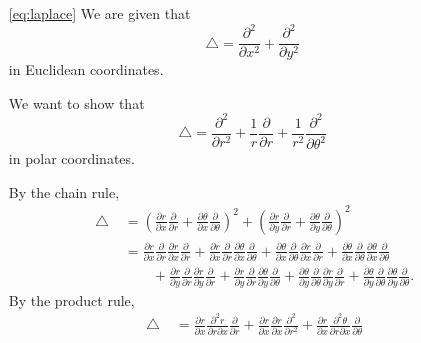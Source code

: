 \documentclass[oneside]{article}
\newcommand*\Laplace{\mathop{}\!\mathbin\bigtriangleup}
\begin{document}
\begin{itemize}
\item[\eqref{eq:laplace}]
We are given that \[
  \Laplace = \frac{\partial^2}{\partial x^2} + \frac{\partial^2}{\partial y^2}
\] in Euclidean coordinates.

We want to show that \[
  \Laplace = \frac{\partial^2}{\partial r^2}
             + \frac{1}{r}\frac{\partial}{\partial r}
             + \frac{1}{r^2}\frac{\partial^2}{\partial\theta^2}
\] in polar coordinates.

By the chain rule,\begin{align*}
  \Laplace
  &= \left(\frac{\partial r}{\partial x}\frac{\partial}{\partial r}
        +\frac{\partial\theta}{\partial x}\frac{\partial}{\partial\theta}
        \right)^2
    + \left(\frac{\partial r}{\partial y}\frac{\partial}{\partial r}
      + \frac{\partial\theta}{\partial y}\frac{\partial}{\partial\theta}
      \right)^2 \\
  &= \frac{\partial r}{\partial x}\frac{\partial}{\partial r}
      \frac{\partial r}{\partial x}\frac{\partial}{\partial r}
      + \frac{\partial r}{\partial x}\frac{\partial}{\partial r}
        \frac{\partial\theta}{\partial x}\frac{\partial}{\partial\theta}
      + \frac{\partial\theta}{\partial x}\frac{\partial}{\partial\theta}
        \frac{\partial r}{\partial x}\frac{\partial}{\partial r}
      + \frac{\partial\theta}{\partial x}\frac{\partial}{\partial\theta}
        \frac{\partial\theta}{\partial x}\frac{\partial}{\partial\theta} \\
  &\qquad+ \frac{\partial r}{\partial y}\frac{\partial}{\partial r}
           \frac{\partial r}{\partial y}\frac{\partial}{\partial r}
      + \frac{\partial r}{\partial y}\frac{\partial}{\partial r}
        \frac{\partial\theta}{\partial y}\frac{\partial}{\partial\theta}
      + \frac{\partial\theta}{\partial y}\frac{\partial}{\partial\theta}
        \frac{\partial r}{\partial y}\frac{\partial}{\partial r}
      + \frac{\partial\theta}{\partial y}\frac{\partial}{\partial\theta}
         \frac{\partial\theta}{\partial y}\frac{\partial}{\partial\theta} \text{.}
\end{align*} By the product rule,\begin{align*}
  \Laplace
  &= \frac{\partial r}{\partial x}
      \frac{\partial^2 r}{\partial r\partial x}\frac{\partial}{\partial r}
      + \frac{\partial r}{\partial x}
      \frac{\partial r}{\partial x}\frac{\partial^2}{\partial r^2}
      + \frac{\partial r}{\partial x}
        \frac{\partial^2 \theta}{\partial r\partial x}
        \frac{\partial}{\partial\theta}

\end{align*}
\end{itemize}
\end{document}
